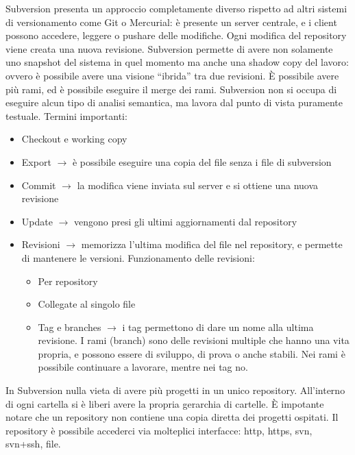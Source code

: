 Subversion presenta un approccio completamente diverso rispetto ad altri sistemi di versionamento come Git o Mercurial: \`e presente un server centrale, e i client possono accedere, leggere o pushare delle modifiche. Ogni modifica del repository viene creata una nuova revisione. Subversion permette di avere non solamente uno snapshot del sistema in quel momento ma anche una shadow copy del lavoro: ovvero \`e possibile avere una visione ``ibrida'' tra due revisioni. \`E possibile avere pi\`u rami, ed \`e possibile eseguire il merge dei rami.
Subversion non si occupa di eseguire alcun tipo di analisi semantica, ma lavora dal punto di vista puramente testuale.
Termini importanti:
\begin{itemize}

\item Checkout e working copy
\item Export $\to$ \`e possibile eseguire una copia del file senza i file di subversion
\item Commit $\to$ la modifica viene inviata sul server e si ottiene una nuova revisione
\item Update $\to$ vengono presi gli ultimi aggiornamenti dal repository
\item Revisioni $\to$ memorizza l'ultima modifica del file nel repository, e permette di mantenere le versioni. Funzionamento delle revisioni:
  \begin{itemize}
    
  \item Per repository
  \item Collegate al singolo file
  \item Tag e branches $\to$ i tag permettono di dare un nome alla ultima revisione. I rami (branch) sono delle revisioni multiple che hanno una vita propria, e possono essere di sviluppo, di prova o anche stabili. Nei rami \`e possibile continuare a lavorare, mentre nei tag no.
    
  \end{itemize}

\end{itemize}

In Subversion nulla vieta di avere pi\`u progetti in un unico repository. All'interno di ogni cartella si \`e liberi avere la propria gerarchia di cartelle. \`E impotante notare che un repository non contiene una copia diretta dei progetti ospitati. Il repository \`e possibile accederci via molteplici interfacce: http, https, svn, svn+ssh, file.

